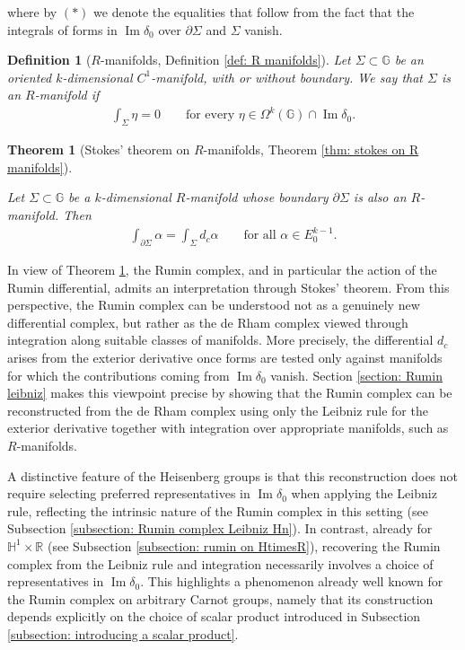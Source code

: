 \documentclass[dvipsnames]{amsart}
\newtheorem{theoremAlph}{Theorem}
\newtheorem{definAlph}{Definition}
\theoremstyle{definition}
\theoremstyle{definition}
\numberwithin{equation}{section}
\newcommand{\R}{\mathbb{R}}
\newcommand{\G}{\mathbb{G}}
\renewcommand{\H}{\mathbb{H}}
\begin{document}
    where by $(\ast)$ we denote the equalities that follow from the fact that the integrals of forms in $\operatorname{Im}\delta_0$ over  $\partial\Sigma$ and $\Sigma$ vanish.
\begin{definAlph}
    [$R$-manifolds, Definition \ref{def: R manifolds}]
    Let \(\Sigma\subset\mathbb{G}\) be an oriented \(k\)-dimensional \(C^1\)-manifold, with or without boundary. We say that \(\Sigma\) is an \(R\)-manifold if
    \begin{align*}
        \int_\Sigma\eta=0
        \qquad
        \text{for every }
        \eta\in\Omega^k(\G)\cap\operatorname{Im}\delta_0 .
    \end{align*}
\end{definAlph}


\begin{theoremAlph}
    [Stokes' theorem on \(R\)-manifolds, Theorem \ref{thm: stokes on R manifolds}]\label{thm: A}
    
    Let \(\Sigma\subset\G\) be a \(k\)-dimensional \(R\)-manifold whose boundary \(\partial\Sigma\) is also an \(R\)-manifold. Then
    \begin{align*}
        \int_{\partial\Sigma}\alpha
        =
        \int_\Sigma d_c\alpha
        \qquad
        \text{for all }
        \alpha\in E_0^{k-1}.
    \end{align*}
\end{theoremAlph}
In view of Theorem \ref{thm: A}, the Rumin complex, and in particular the action of the Rumin differential, admits an interpretation through Stokes' theorem. From this perspective, the Rumin complex can be understood not as a genuinely new differential complex, but rather as the de Rham complex viewed through integration along suitable classes of manifolds. More precisely, the differential $d_c$
 arises from the exterior derivative once forms are tested only against manifolds for which the contributions coming from $\operatorname{Im}\delta_0$ vanish. Section \ref{section: Rumin leibniz} makes this viewpoint precise by showing that the Rumin complex can be reconstructed from the de Rham complex using only the Leibniz rule for the exterior derivative together with integration over appropriate manifolds, such as $R$-manifolds.

A distinctive feature of the Heisenberg groups is that this reconstruction does not require selecting preferred representatives in $\operatorname{Im}\delta_0$
 when applying the Leibniz rule, reflecting the intrinsic nature of the Rumin complex in this setting (see Subsection \ref{subsection: Rumin complex Leibniz Hn}). In contrast, already for $\H^1\times\R$ (see Subsection \ref{subsection: rumin on HtimesR}), recovering the Rumin complex from the Leibniz rule and integration necessarily involves a choice of representatives in $\operatorname{Im}\delta_0$. This highlights a phenomenon already well known for the Rumin complex on arbitrary Carnot groups, namely that its construction depends explicitly on the choice of scalar product introduced in Subsection \ref{subsection: introducing a scalar product}.
\end{document}
